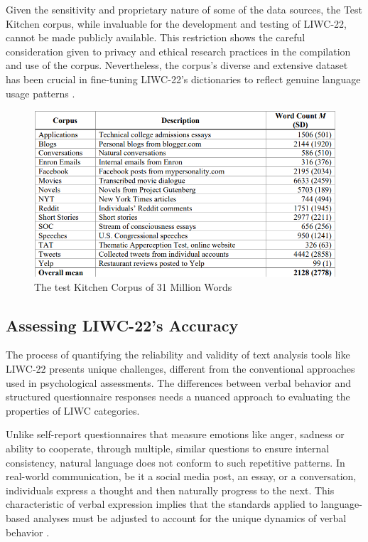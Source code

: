 Given the sensitivity and proprietary nature of some of the data sources, the Test Kitchen corpus, while invaluable for the development and testing of LIWC-22, cannot be made publicly available. This restriction shows the careful consideration given to privacy and ethical research practices in the compilation and use of the corpus. Nevertheless, the corpus's diverse and extensive dataset has been crucial in fine-tuning LIWC-22's dictionaries to reflect genuine language usage patterns .

\begin{figure}[htbp]
	\centering
		\includegraphics[scale=0.65]{./figures/test-kitchen-corpus.png}
	\caption{The test Kitchen Corpus of 31 Million Words \cite{boyd2022development}}
	\label{FigKitchenCorpus}
\end{figure}

\subsection{Assessing LIWC-22's Accuracy}

\quad The process of quantifying the reliability and validity of text analysis tools like LIWC-22 presents unique challenges, different from the conventional approaches used in psychological assessments. The differences between verbal behavior and structured questionnaire responses needs a nuanced approach to evaluating the properties of LIWC categories.

Unlike self-report questionnaires that measure emotions like anger, sadness or ability to cooperate, through multiple, similar questions to ensure internal consistency, natural language does not conform to such repetitive patterns. In real-world communication, be it a social media post, an essay, or a conversation, individuals express a thought and then naturally progress to the next. This characteristic of verbal expression implies that the standards applied to language-based analyses must be adjusted to account for the unique dynamics of verbal behavior \cite{boyd2022development}.


